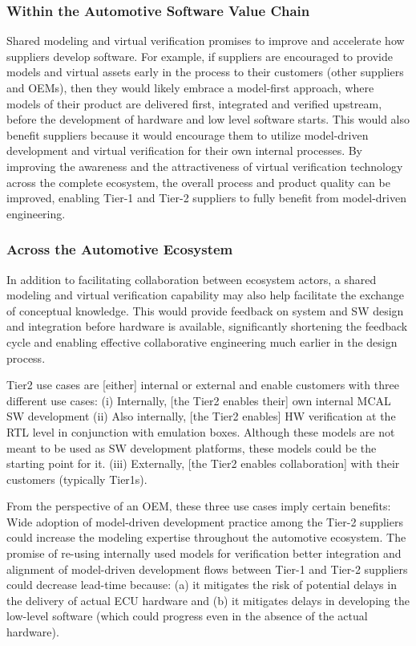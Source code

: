 \subsubsection{Within the Automotive Software Value Chain}
Shared modeling and virtual verification promises to improve and accelerate how suppliers develop software. For example, if suppliers are encouraged to provide models and virtual assets early in the process to their customers (other suppliers and OEMs), then they would likely embrace a model-first approach, where models of their product are delivered first, integrated and verified upstream, before the development of hardware and low level software starts. This would also benefit suppliers because it would encourage them to utilize model-driven development and virtual verification for their own internal processes.
By improving the awareness and the attractiveness of virtual verification technology across the complete ecosystem, the overall process and product quality can be improved, enabling Tier-1 and Tier-2 suppliers to fully benefit from model-driven engineering.

\subsubsection{Across the Automotive Ecosystem}
In addition to facilitating collaboration between ecosystem actors, a shared modeling and virtual verification capability may also help facilitate the exchange of conceptual knowledge. This would provide feedback on system and SW design and integration before hardware is available, significantly shortening the feedback cycle and enabling effective collaborative engineering much earlier in the design process.

Tier2 use cases are [either] internal or external and enable customers with three different use cases: (i) Internally, [the Tier2 enables their] own internal MCAL SW development (ii) Also internally, [the Tier2 enables] HW verification at the RTL level in conjunction with emulation boxes. Although these models are not meant to be used as SW development platforms, these models could be the starting point for it. (iii) Externally, [the Tier2 enables collaboration] with their customers (typically Tier1s).

From the perspective of an OEM, these three use cases imply certain benefits: Wide adoption of model-driven development practice among the Tier-2 suppliers could increase the modeling expertise throughout the automotive ecosystem. The promise of re-using internally used models for verification better integration and alignment of model-driven development flows between Tier-1 and Tier-2 suppliers could decrease lead-time because: (a) it mitigates the risk of potential delays in the delivery of actual ECU hardware and (b) it mitigates delays in developing the low-level software (which could progress even in the absence of the actual hardware).
